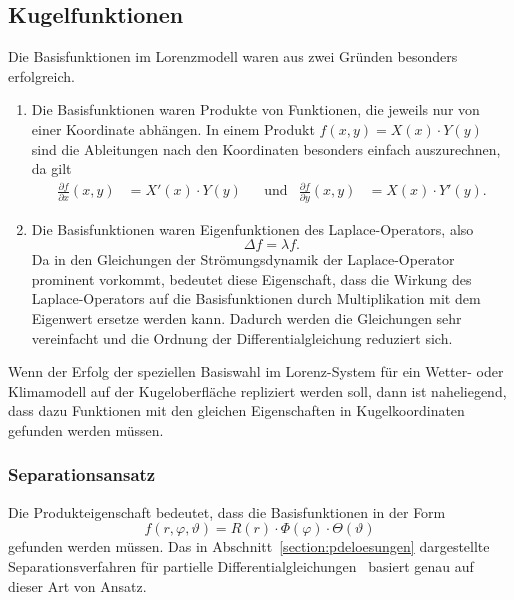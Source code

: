 %
%
%
\subsection{Kugelfunktionen}
Die Basisfunktionen im Lorenzmodell waren aus zwei Gründen besonders
erfolgreich.
\begin{enumerate}
\item
Die Basisfunktionen waren Produkte von Funktionen, die jeweils nur von
einer Koordinate abhängen.
In einem Produkt 
$f(x,y)=X(x)\cdot Y(y)$ 
sind die Ableitungen nach den Koordinaten besonders einfach auszurechnen,
da gilt
\[
\begin{aligned}
\frac{\partial f}{\partial x}(x,y) &= X'(x)\cdot Y(y)
&&\text{und}&
\frac{\partial f}{\partial y}(x,y) &= X(x)\cdot Y'(y).
\end{aligned}
\]
\item
Die Basisfunktionen waren Eigenfunktionen des Laplace-Operators, also
\[
\Delta f = \lambda f.
\]
Da in den Gleichungen der Strömungsdynamik der Laplace-Operator
prominent vorkommt, bedeutet diese Eigenschaft, dass die Wirkung des
Laplace-Operators auf die Basisfunktionen durch Multiplikation mit
dem Eigenwert ersetze werden kann.
Dadurch werden die Gleichungen sehr vereinfacht und die Ordnung
der Differentialgleichung reduziert sich.
\end{enumerate}
Wenn der Erfolg der speziellen Basiswahl im Lorenz-System für ein
Wetter- oder Klimamodell auf der Kugeloberfläche repliziert werden
soll, dann ist naheliegend, dass dazu Funktionen mit den gleichen
Eigenschaften in Kugelkoordinaten gefunden werden müssen.

\subsubsection{Separationsansatz}
Die Produkteigenschaft bedeutet, dass die Basisfunktionen in der Form
\[
f(r,\varphi,\vartheta)
=
R(r)\cdot \Phi(\varphi)\cdot \Theta(\vartheta)
\]
gefunden werden müssen.
Das in Abschnitt~\ref{section:pdeloesungen} dargestellte
Separationsverfahren für partielle
Differentialgleichungen~\cite[Chapter 4]{skript:pde}
basiert genau auf dieser Art von Ansatz.

